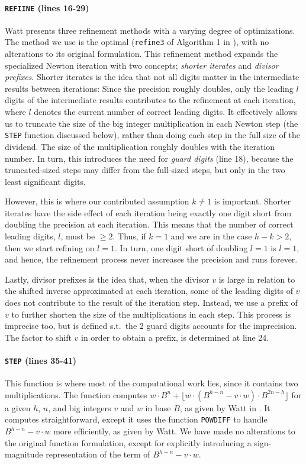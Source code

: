 \paragraph{\texttt{REFIINE} (lines 16-29)}
Watt presents three refinement methods with a varying degree of
optimizations. The method we use is the optimal (\texttt{refine3} of Algorithm 1
in \cite{watt2023efficient}), with no alterations to its original
formulation. This refinement method expands the specialized Newton iteration
with two concepts; \textit{shorter iterates} and \textit{divisor
  prefixes}. Shorter iterates is the idea that not all digits matter in the
intermediate results between iterations: Since the precision roughly doubles,
only the leading $l$ digits of the intermediate results contributes to the
refinement at each iteration, where $l$ denotes the current number of correct
leading digits. It effectively allows us to truncate the size of the big integer
multiplication in each Newton step (the \texttt{STEP} function discussed below),
rather than doing each step in the full size of the dividend. The size of the
multiplication roughly doubles with the iteration number. In turn, this
introduces the need for \textit{guard digits} (line 18), because the
truncated-sized steps may differ from the full-sized steps, but only in the two
least significant digits.

However, this is where our contributed assumption $k \neq 1$ is important. Shorter
iterates have the side effect of each iteration being exactly one digit short
from doubling the precision at each iteration. This means that the number of
correct leading digits, $l$, must be $\geq 2$. Thus, if $k = 1$ and we are in the
case $h-k>2$, then we start refining on $l=1$. In turn, one digit short of
doubling $l=1$ is $l=1$, and hence, the refinement process never increases the
precision and runs forever.

Lastly, divisor prefixes is the idea that, when the divisor $v$ is large in
relation to the shifted inverse approximated at each iteration, some of the
leading digits of $v$ does not contribute to the result of the iteration
step. Instead, we use a prefix of $v$ to further shorten the size of the
multiplications in each step. This process is imprecise too, but is defined
s.t.\ the 2 guard digits accounts for the imprecision. The factor to shift $v$
in order to obtain a prefix, is determined at line 24.

\paragraph{\texttt{STEP} (lines 35-41)}
This function is where most of the computational work lies, since it contains
two multiplications. The function computes
$w\cdot B^n + \lfloor w \cdot (B^{h-n} - v \cdot w) \cdot B^{2n - h}\rfloor$ for a given
$h$, $n$, and big integers $v$ and $w$ in base $B$, as given by Watt in
\cite{watt2023efficient}. It computes straightforward, except it uses the
function \texttt{POWDIFF} to handle $B^{h-n} - v \cdot w$ more efficiently, as
given by Watt. We have made no alterations to the original function formulation,
except for explicitly introducing a sign-magnitude representation of the term of
$B^{h-n} - v \cdot w$.

